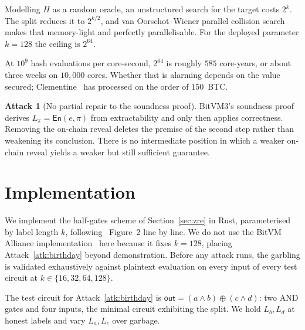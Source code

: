 \documentclass[11pt,a4paper]{article}
\theoremstyle{definition}
\newtheorem{attack}{Attack}
\theoremstyle{plain}
\newcommand{\En}{\mathsf{En}}
\newcommand{\Hh}{H}
\begin{document}
Modelling $\Hh$ as a random oracle, an unstructured search for the target costs
$2^{k}$. The split reduces it to $2^{k/2}$, and van Oorschot--Wiener parallel
collision search~\cite{vOW99} makes that memory-light and perfectly
parallelisable. For the deployed parameter $k=128$ the ceiling is $2^{64}$.

At $10^{9}$ hash evaluations per core-second, $2^{64}$ is roughly $585$
core-years, or about three weeks on $10{,}000$ cores. Whether that is alarming
depends on the value secured; Clementine~\cite{Clementine} has processed on the
order of $150$~BTC.

\begin{attack}[No partial repair to the soundness proof]
\label{atk:proof}
BitVM3's soundness proof derives $L_\pi = \En(e,\pi)$ from extractability and
only then applies correctness. Removing the on-chain reveal deletes the premise
of the second step rather than weakening its conclusion. There is no
intermediate position in which a weaker on-chain reveal yields a weaker but
still sufficient guarantee.
\end{attack}

\section{Implementation}
\label{sec:impl}

We implement the half-gates scheme of Section~\ref{sec:zre} in Rust,
parameterised by label length $k$, following~\cite{ZRE15} Figure~2 line by line.
We do not use the BitVM Alliance implementation~\cite{GSV} here because it fixes
$k = 128$, placing Attack~\ref{atk:birthday} beyond demonstration. Before any
attack runs, the garbling is validated exhaustively against plaintext evaluation
on every input of every test circuit at $k \in \{16,32,64,128\}$.

The test circuit for Attack~\ref{atk:birthday} is
$\textsf{out} = (a \wedge b) \oplus (c \wedge d)$: two AND gates and four
inputs, the minimal circuit exhibiting the split. We hold $L_b, L_d$ at honest
labels and vary $L_a, L_c$ over garbage.
\end{document}
